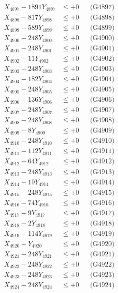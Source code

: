 \documentclass[a4paper,10pt]{article}
\begin{document}
{\begin{align}
X_{4897} - 1891Y_{4897} &\leq +0 && \text{(G4897)} \\
X_{4898} - 817Y_{4898} &\leq +0 && \text{(G4898)} \\
X_{4899} - 589Y_{4899} &\leq +0 && \text{(G4899)} \\
X_{4900} - 248Y_{4900} &\leq +0 && \text{(G4900)} \\
\allowbreak
X_{4901} - 248Y_{4901} &\leq +0 && \text{(G4901)} \\
X_{4902} - 11Y_{4902} &\leq +0 && \text{(G4902)} \\
X_{4903} - 248Y_{4903} &\leq +0 && \text{(G4903)} \\
X_{4904} - 182Y_{4904} &\leq +0 && \text{(G4904)} \\
X_{4905} - 248Y_{4905} &\leq +0 && \text{(G4905)} \\
X_{4906} - 136Y_{4906} &\leq +0 && \text{(G4906)} \\
X_{4907} - 248Y_{4907} &\leq +0 && \text{(G4907)} \\
X_{4908} - 248Y_{4908} &\leq +0 && \text{(G4908)} \\
X_{4909} - 8Y_{4909} &\leq +0 && \text{(G4909)} \\
X_{4910} - 248Y_{4910} &\leq +0 && \text{(G4910)} \\
\allowbreak
X_{4911} - 112Y_{4911} &\leq +0 && \text{(G4911)} \\
X_{4912} - 64Y_{4912} &\leq +0 && \text{(G4912)} \\
X_{4913} - 248Y_{4913} &\leq +0 && \text{(G4913)} \\
X_{4914} - 19Y_{4914} &\leq +0 && \text{(G4914)} \\
X_{4915} - 248Y_{4915} &\leq +0 && \text{(G4915)} \\
X_{4916} - 74Y_{4916} &\leq +0 && \text{(G4916)} \\
X_{4917} - 9Y_{4917} &\leq +0 && \text{(G4917)} \\
X_{4918} - 2Y_{4918} &\leq +0 && \text{(G4918)} \\
X_{4919} - 114Y_{4919} &\leq +0 && \text{(G4919)} \\
X_{4920} - Y_{4920} &\leq +0 && \text{(G4920)} \\
\allowbreak
X_{4921} - 248Y_{4921} &\leq +0 && \text{(G4921)} \\
X_{4922} - 248Y_{4922} &\leq +0 && \text{(G4922)} \\
X_{4923} - 248Y_{4923} &\leq +0 && \text{(G4923)} \\
X_{4924} - 248Y_{4924} &\leq +0 && \text{(G4924)} \\

\end{align}}
\end{document}
